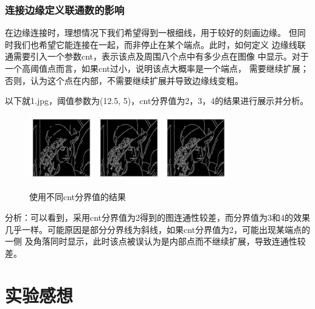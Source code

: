 \documentclass{article}
\begin{document}
\subsubsection{连接边缘定义联通数的影响}

    在边缘连接时，理想情况下我们希望得到一根细线，用于较好的刻画边缘。
    但同时我们也希望它能连接在一起，而非停止在某个端点。此时，如何定义
    边缘线联通需要引入一个参数cnt，表示该点及周围八个点中有多少点在图像
    中显示。对于一个高阈值点而言，如果cnt过小，说明该点大概率是一个端点，
    需要继续扩展；否则，认为这个点在内部，不需要继续扩展并导致边缘线变粗。

    以下就1.jpg，阈值参数为(12.5, 5)，cnt分界值为2，3，4的结果进行展示并分析。

\begin{figure}[h]
    \centering
    \includegraphics[width=0.25\textwidth]{./contrast/1_cnt=2}
    \includegraphics[width=0.25\textwidth]{./contrast/1_cnt=3}
    \includegraphics[width=0.25\textwidth]{./contrast/1_cnt=4}
    \caption{使用不同cnt分界值的结果}
\end{figure}

    分析：可以看到，采用cnt分界值为2得到的图连通性较差，而分界值为3和4的效果
    几乎一样。可能原因是部分分界线为斜线，如果cnt分界值为2，可能出现某端点的一侧
    及角落同时显示，此时该点被误认为是内部点而不继续扩展，导致连通性较差。

\section{实验感想}
\end{document}
